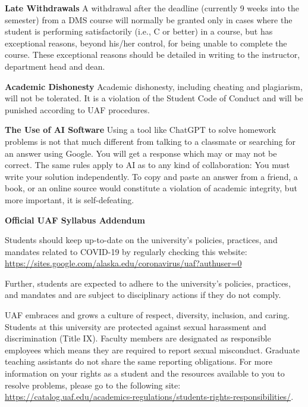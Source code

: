 \documentclass[12pt]{article}
\begin{document}
\textbf{Late Withdrawals} 
A withdrawal after the deadline (currently 9 weeks into the semester) from a DMS course will normally be granted only in cases where the student is performing satisfactorily (i.e., C or better) in a course, but has exceptional reasons, beyond his/her control, for being unable to complete the course. These exceptional reasons should be detailed in writing to the instructor, department head and dean.

\textbf{Academic Dishonesty}
Academic dishonesty, including cheating and plagiarism, will not
be tolerated.  It is a violation of the Student Code of Conduct
and will be punished according to UAF procedures.

\textbf{The Use of AI Software}
Using a tool like ChatGPT to solve homework problems is not that much different from talking to a classmate or searching for an answer using Google. You will get a response which may or may not be correct. The same rules apply to AI as to any kind of collaboration: You must write your solution independently. To copy and paste an answer from a friend, a book, or an online source would constitute a violation of academic integrity, but more important, it is self-defeating.

\begin{center}\textbf{\large{Official UAF Syllabus Addendum}}\end{center}

 Students should keep up-to-date on the university's policies, practices, and mandates related to COVID-19 by regularly checking this website: \url{https://sites.google.com/alaska.edu/coronavirus/uaf?authuser=0}

Further, students are expected to adhere to the university's policies, practices, and mandates and are subject to disciplinary actions if they do not comply.

 UAF embraces and grows a culture of respect, diversity, inclusion, and caring. Students at this university are protected against sexual harassment and discrimination (Title IX). Faculty members are designated as responsible employees which means they are required to report sexual misconduct. Graduate teaching assistants do not share the same reporting obligations. For more information on your rights as a student and the resources available to you to resolve problems, please go to the following site: \url{https://catalog.uaf.edu/academics-regulations/students-rights-responsibilities/}.
\end{document}

